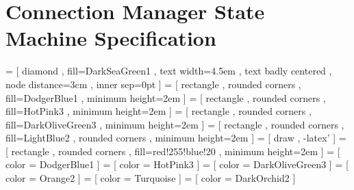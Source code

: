 

\chapter{Connection Manager State Machine Specification}
\label{chapter:connection-manager}

 =
  [ diamond
  , fill=DarkSeaGreen1
  , text width=4.5em
  , text badly centered
  , node distance=3cm
  , inner sep=0pt
  ]
 =
  [ rectangle
  , rounded corners
  , fill=DodgerBlue1
  , minimum height=2em
  ]
 =
  [ rectangle
  , rounded corners
  , fill=HotPink3
  , minimum height=2em
  ]
 =
  [ rectangle
  , rounded corners
  , fill=DarkOliveGreen3
  , minimum height=2em
  ]
 =
  [ rectangle
  , rounded corners
  , fill=LightBlue2
  , rounded corners
  , minimum height=2em
  ]
 =
  [ draw
  , -latex'
  ]
 =
  [ rectangle
  , rounded corners
  , fill=red!255!blue!20
  , minimum height=2em
  ]
      = [ color = DodgerBlue1 ]
      = [ color = HotPink3 ]
 = [ color = DarkOliveGreen3 ]
  = [ color = Orange2 ]
   = [ color = Turquoise ]
    = [ color = DarkOrchid2 ]

\def\TCP{\textsf{TCP}}
\def\ipvfour{\textsf{ipv4}}
\def\ipvsix{\textsf{ipv6}}

